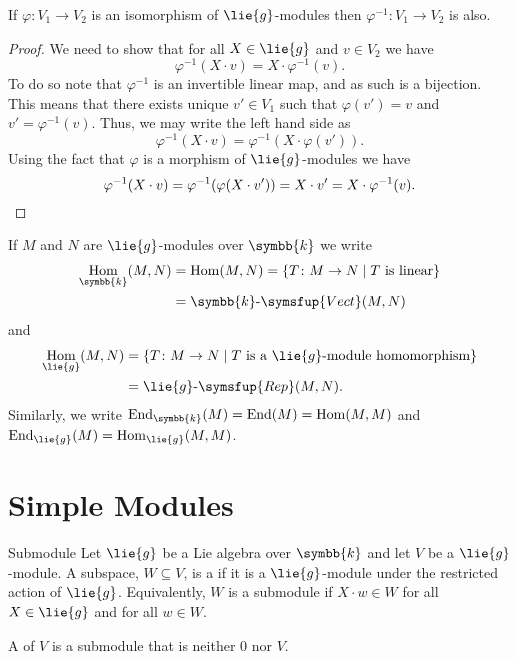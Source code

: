 \documentclass[fleqn]{NotesClass}
\makeatletter
\renewcommand{\field}{\symbb{k}}
\newcommand{\c@egory}[1]{\symsfup{#1}}
\newcommand{\Vect}[1][\field]{#1\text{-}\c@egory{Vect}}
\newcommand{\Rep}[1][\lie{g}]{#1\text{-}\c@egory{Rep}}
\DeclareMathOperator{\Hom}{Hom}
\DeclareMathOperator{\End}{End}
\makeatother
\begin{document}
    \begin{lma}{}{}
        If \(\varphi \colon V_1 \to V_2\) is an isomorphism of \(\lie{g}\)-modules then \(\varphi^{-1} \colon V_1 \to V_2\) is also.
        \begin{proof}
            We need to show that for all \(X \in \lie{g}\) and \(v \in V_2\) we have
            \begin{equation}
                \varphi^{-1}(X \cdot v) = X \cdot \varphi^{-1}(v).
            \end{equation}
            To do so note that \(\varphi^{-1}\) is an invertible linear map, and as such is a bijection.
            This means that there exists unique \(v' \in V_1\) such that \(\varphi(v') = v\) and \(v' = \varphi^{-1}(v)\).
            Thus, we may write the left hand side as
            \begin{equation}
                \varphi^{-1}(X \cdot v) = \varphi^{-1}(X \cdot \varphi(v')).
            \end{equation}
            Using the fact that \(\varphi\) is a morphism of \(\lie{g}\)-modules we have
            \begin{equation}
                \varphi^{-1}(X \cdot v) = \varphi^{-1}(\varphi(X \cdot v')) = X \cdot v' = X \cdot \varphi^{-1}(v). \qedhere
            \end{equation}
        \end{proof}
    \end{lma}
    
    \begin{ntn}{}{}
        If \(M\) and \(N\) are \(\lie{g}\)-modules over \(\field\) we write
        \begin{align}
            \Hom_{\field}(M, N) &= \Hom(M, N) = \{T \colon M \to N \mid T \text{ is linear}\}\\
            &= \Vect(M, N)
        \end{align}
        and
        \begin{align}
            \Hom_{\lie{g}}(M, N) &= \{T \colon M \to N \mid T \text{ is a } \lie{g} \text{-module homomorphism}\}\\
            &= \Rep(M, N).
        \end{align}
        Similarly, we write \(\End_{\field}(M) = \End(M) = \Hom(M, M)\) and \(\End_{\lie{g}}(M) = \Hom_{\lie{g}}(M, M)\).
    \end{ntn}
    
    \section{Simple Modules}
    \begin{dfn}{Submodule}{}
        Let \(\lie{g}\) be a Lie algebra over \(\field\) and let \(V\) be a \(\lie{g}\)-module.
        A subspace, \(W \subseteq V\), is a  if it is a \(\lie{g}\)-module under the restricted action of \(\lie{g}\).
        Equivalently, \(W\) is a submodule if \(X \cdot w \in W\) for all \(X \in \lie{g}\) and for all \(w \in W\).
        
        A  of \(V\) is a submodule that is neither \(0\) nor \(V\).
    \end{dfn}
    
\end{document}
